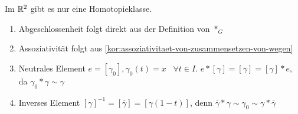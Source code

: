 \begin{bemerkung}
    Im $\mathbb{R}^2$ gibt es nur eine Homotopieklasse.
\end{bemerkung}

\begin{beweis}\leavevmode
    \begin{enumerate}[label=\alph*)]
        \item Abgeschlossenheit folgt direkt aus der Definition von $*_G$
        \item Assoziativität folgt aus \cref{kor:assoziativitaet-von-zusammensetzen-von-wegen}
        \item Neutrales Element $e = [\gamma_0], \gamma_0(t) = x \;\;\; \forall t \in I$.
              $e * [\gamma] = [\gamma] = [\gamma] * e$, da $\gamma_0 * \gamma \sim \gamma$
        \item {} Inverses Element  $[\gamma]^{-1} = [\overline{\gamma}] = [\gamma(1-t)]$, 
              denn $\overline{\gamma} * \gamma \sim \gamma_0 \sim \gamma * \overline{\gamma}$
    \end{enumerate}
\end{beweis}

